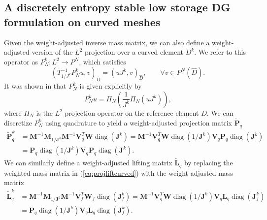 \documentclass[preprint,10pt]{article}
\theoremstyle{definition}
\theoremstyle{lemma}
\theoremstyle{theorem}
\theoremstyle{assumption}
\DeclareMathOperator{\diag}{diag}
\renewcommand{\hat}{\widehat}
\renewcommand{\tilde}{\widetilde}
\newcommand{\LRp}[1]{\left( #1 \right)}
\begin{document}
{\subsection{A discretely entropy stable low storage DG formulation on curved meshes}

Given the weight-adjusted inverse mass matrix, we can also define a weight-adjusted version of the $L^2$ projection over a curved element $D^k$.  We refer to this operator as $P^k_N: L^2\rightarrow P^N$, which satisfies
\[
\LRp{T^{-1}_{1/J^k}P^k_N u,v}_{\hat{D}} = \LRp{uJ^k,v}_{\hat{D}}, \qquad \forall v\in P^N\LRp{\hat{D}}.
\]
It was shown in \cite{chan2016weight2} that $P_N^k $ is given explicitly by
\begin{equation}
P^k_N u = \Pi_N\LRp{\frac{1}{J^k}\Pi_N\LRp{uJ^k}},
\label{eq:wadgproj}
\end{equation}
where $\Pi_N$ is the $L^2$ projection operator on the reference element $\hat{D}$.  We can discretize $P^k_N$ using quadrature to yield a weight-adjusted projection matrix $\tilde{\bm{P}}_q$ 
\begin{align}
\tilde{\bm{P}}^k_q &= \bm{M}^{-1}\bm{M}_{1/\bm{J}^k}\bm{M}^{-1}\bm{V}_q^T\bm{W}\diag\LRp{\bm{J}^k} = \bm{M}^{-1}\bm{V}_q^T\bm{W}\diag\LRp{1/\bm{J}^k} \bm{V}_q\bm{P}_q\diag\LRp{\bm{J}^k} \nonumber\\
&= \bm{P}_q \diag\LRp{{1}/{\bm{J}^k}} \bm{V}_q\bm{P}_q \diag\LRp{\bm{J}^k}.
\label{eq:wadgproj}
\end{align}
We can similarly define a weight-adjusted lifting matrix $\tilde{\bm{L}}_q$ by replacing the weighted mass matrix in (\ref{eq:projliftcurved}) with the weight-adjusted mass matrix
\begin{align}
\tilde{\bm{L}}^k_q &= \bm{M}^{-1}\bm{M}_{1/\bm{J}^k}\bm{M}^{-1}\bm{V}_f^T\bm{W}_f\diag\LRp{\bm{J}^k_f} = \bm{M}^{-1}\bm{V}_q^T\bm{W}\diag\LRp{1/\bm{J}^k} \bm{V}_q\bm{L}_q\diag\LRp{\bm{J}^k_f} \nonumber\\
&= \bm{P}_q \diag\LRp{{1}/{\bm{J}^k}} \bm{V}_q\bm{L}_q \diag\LRp{\bm{J}^k_f}.
\label{eq:wadglift}
\end{align}

}
\end{document}
